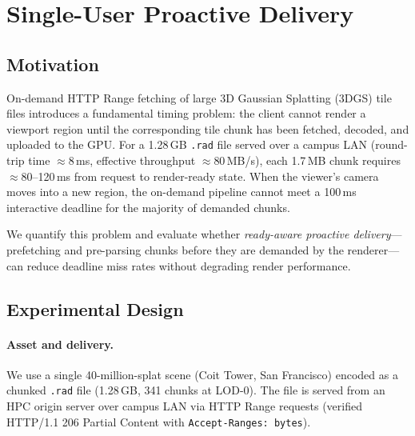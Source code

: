 
\section{Single-User Proactive Delivery}
\label{sec:single-proactive}

\subsection{Motivation}

On-demand HTTP Range fetching of large 3D Gaussian Splatting (3DGS) tile files
introduces a fundamental timing problem: the client cannot render a viewport
region until the corresponding tile chunk has been fetched, decoded, and
uploaded to the GPU. For a 1.28\,GB \texttt{.rad} file served over a campus
LAN (round-trip time $\approx$8\,ms, effective throughput $\approx$80\,MB/s),
each 1.7\,MB chunk requires $\approx$80--120\,ms from request to render-ready
state. When the viewer's camera moves into a new region, the on-demand
pipeline cannot meet a 100\,ms interactive deadline for the majority of
demanded chunks.

We quantify this problem and evaluate whether \emph{ready-aware proactive
delivery}---prefetching and pre-parsing chunks before they are demanded by the
renderer---can reduce deadline miss rates without degrading render performance.

\subsection{Experimental Design}

\paragraph{Asset and delivery.}
We use a single 40-million-splat scene (Coit Tower, San Francisco) encoded as
a chunked \texttt{.rad} file (1.28\,GB, 341 chunks at LOD-0). The file is
served from an HPC origin server over campus LAN via HTTP Range requests
(verified HTTP/1.1 206 Partial Content with \texttt{Accept-Ranges: bytes}).

